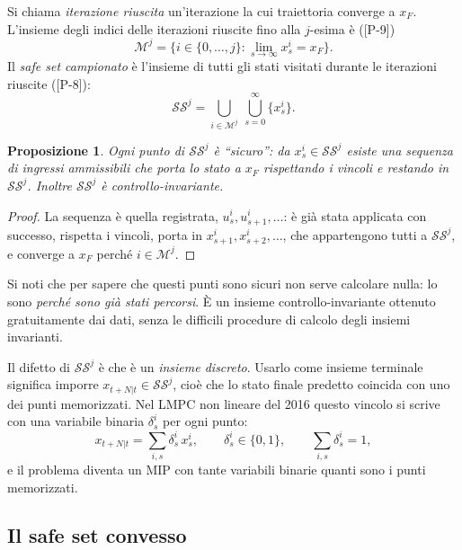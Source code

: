 \documentclass[11pt,a4paper]{article}
\theoremstyle{definition}
\theoremstyle{plain}
\newtheorem{proposizione}[definizione]{Proposizione}
\theoremstyle{remark}
\newcommand{\SSet}{\mathcal{SS}}
\newcommand{\Mc}{\mathcal{M}}
\newcommand{\eqp}[1]{\textup{[P-#1]}}   %
\begin{document}
Si chiama \emph{iterazione riuscita} un'iterazione la cui traiettoria
converge a $x_F$. L'insieme degli indici delle iterazioni riuscite fino alla
$j$-esima è (\eqp{9})
\begin{equation}\label{eq:Mj}
  \Mc^j = \Big\{ i\in\{0,\dots,j\} : \lim_{s\to\infty} x^i_s = x_F \Big\}.
\end{equation}
Il \emph{safe set campionato} è l'insieme di tutti gli stati visitati durante
le iterazioni riuscite (\eqp{8}):
\begin{equation}\label{eq:SS}
  \SSet^j = \bigcup_{i\in\Mc^j}\ \bigcup_{s=0}^{\infty}\{x^i_s\}.
\end{equation}

\begin{proposizione}\label{prop:SS}
Ogni punto di $\SSet^j$ è ``sicuro'': da $x^i_s\in\SSet^j$ esiste una
sequenza di ingressi ammissibili che porta lo stato a $x_F$ rispettando i
vincoli e restando in $\SSet^j$. Inoltre $\SSet^j$ è controllo-invariante.
\end{proposizione}
\begin{proof}
La sequenza è quella registrata, $u^i_s,u^i_{s+1},\dots$: è già stata
applicata con successo, rispetta i vincoli, porta in $x^i_{s+1},x^i_{s+2},\dots$,
che appartengono tutti a $\SSet^j$, e converge a $x_F$ perché $i\in\Mc^j$.
\end{proof}

Si noti che per sapere che questi punti sono sicuri non serve calcolare
nulla: lo sono \emph{perché sono già stati percorsi}. È un insieme
controllo-invariante ottenuto gratuitamente dai dati, senza le difficili
procedure di calcolo degli insiemi invarianti.

Il difetto di $\SSet^j$ è che è un \emph{insieme discreto}. Usarlo come
insieme terminale significa imporre $x_{t+N|t}\in\SSet^j$, cioè che lo stato
finale predetto coincida con uno dei punti memorizzati. Nel LMPC non lineare
del 2016 questo vincolo si scrive con una variabile binaria $\delta^i_s$ per
ogni punto:
\[
  x_{t+N|t}=\sum_{i,s}\delta^i_s\,x^i_s,\qquad \delta^i_s\in\{0,1\},\qquad
  \sum_{i,s}\delta^i_s = 1,
\]
e il problema diventa un MIP con tante variabili binarie quanti sono i punti
memorizzati.

\subsection{Il safe set convesso}
\end{document}
